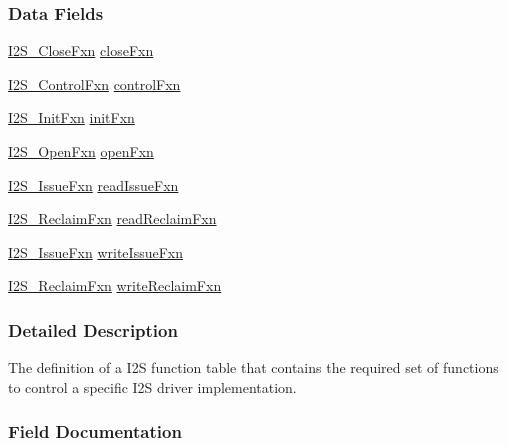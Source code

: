 \subsubsection*{Data Fields}
\begin{DoxyCompactItemize}
\item 
\hyperlink{_i2_s_8h_a91bfa91197cb8ff2388744088177dde8}{I2\+S\+\_\+\+Close\+Fxn} \hyperlink{struct_i2_s___fxn_table_a8fecb9511011ad3dc7166f96f2faf4a9}{close\+Fxn}
\item 
\hyperlink{_i2_s_8h_aec416642887dbc181166c479a79c5615}{I2\+S\+\_\+\+Control\+Fxn} \hyperlink{struct_i2_s___fxn_table_ad7a198cbe91c9df75202579bbe8033c8}{control\+Fxn}
\item 
\hyperlink{_i2_s_8h_a17f21fcbc2627ef97044ee7ff6cfdee6}{I2\+S\+\_\+\+Init\+Fxn} \hyperlink{struct_i2_s___fxn_table_ae851340eaf8b8604b820b7673a4421da}{init\+Fxn}
\item 
\hyperlink{_i2_s_8h_a0a8c4787b4a5a262dc86d9dfa7da2840}{I2\+S\+\_\+\+Open\+Fxn} \hyperlink{struct_i2_s___fxn_table_afd1a3ac570d096b92407681b55936489}{open\+Fxn}
\item 
\hyperlink{_i2_s_8h_a29e133c66e4e69905690c63157ca662d}{I2\+S\+\_\+\+Issue\+Fxn} \hyperlink{struct_i2_s___fxn_table_ab91dca8f762e825eb15b9c75c19d989b}{read\+Issue\+Fxn}
\item 
\hyperlink{_i2_s_8h_aeb85638443d9071ae1e46233cb7ed82c}{I2\+S\+\_\+\+Reclaim\+Fxn} \hyperlink{struct_i2_s___fxn_table_aa13910b4544fdf48044543614915b769}{read\+Reclaim\+Fxn}
\item 
\hyperlink{_i2_s_8h_a29e133c66e4e69905690c63157ca662d}{I2\+S\+\_\+\+Issue\+Fxn} \hyperlink{struct_i2_s___fxn_table_a8213ff3590792c7d5044ff7959f2c68a}{write\+Issue\+Fxn}
\item 
\hyperlink{_i2_s_8h_aeb85638443d9071ae1e46233cb7ed82c}{I2\+S\+\_\+\+Reclaim\+Fxn} \hyperlink{struct_i2_s___fxn_table_a829e8e190e442f69e19d2568a339409a}{write\+Reclaim\+Fxn}
\end{DoxyCompactItemize}


\subsubsection{Detailed Description}
The definition of a I2\+S function table that contains the required set of functions to control a specific I2\+S driver implementation. 

\subsubsection{Field Documentation}
